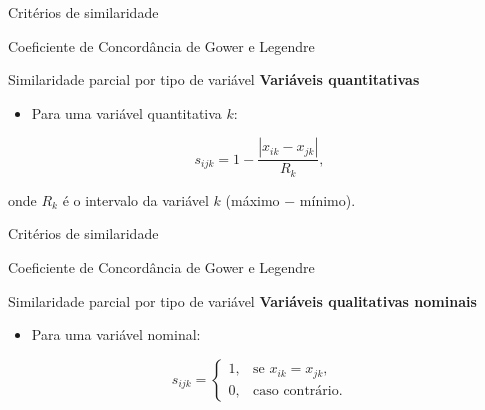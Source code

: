 \documentclass[
  ignorenonframetext,
  aspectratio=169,
]{beamer}
\providecommand{\tightlist}{%
  \setlength{\itemsep}{0pt}\setlength{\parskip}{0pt}}
\begin{document}
\begin{frame}{Critérios de similaridade}
\label{crituxe9rios-de-similaridade-9}
\begin{block}{Coeficiente de Concordância de Gower e Legendre}
\label{coeficiente-de-concorduxe2ncia-de-gower-e-legendre-3}
\begin{block}{Similaridade parcial por tipo de variável}
\label{similaridade-parcial-por-tipo-de-variuxe1vel}
\textbf{Variáveis quantitativas}

\begin{itemize}
\tightlist
\item
  Para uma variável quantitativa \(k\):
\end{itemize}

\[
s_{ijk}
=
1 - \dfrac{|x_{ik} - x_{jk}|}{R_k},
\]

onde \(R_k\) é o intervalo da variável \(k\) (máximo − mínimo).
\end{block}
\end{block}
\end{frame}

\begin{frame}{Critérios de similaridade}
\label{crituxe9rios-de-similaridade-10}
\begin{block}{Coeficiente de Concordância de Gower e Legendre}
\label{coeficiente-de-concorduxe2ncia-de-gower-e-legendre-4}
\begin{block}{Similaridade parcial por tipo de variável}
\label{similaridade-parcial-por-tipo-de-variuxe1vel-1}
\textbf{Variáveis qualitativas nominais}

\begin{itemize}
\tightlist
\item
  Para uma variável nominal:
\end{itemize}

\[
s_{ijk}
=
\begin{cases}
1, & \text{se } x_{ik} = x_{jk}, \\
0, & \text{caso contrário}.
\end{cases}
\]
\end{block}
\end{block}
\end{frame}
\end{document}
